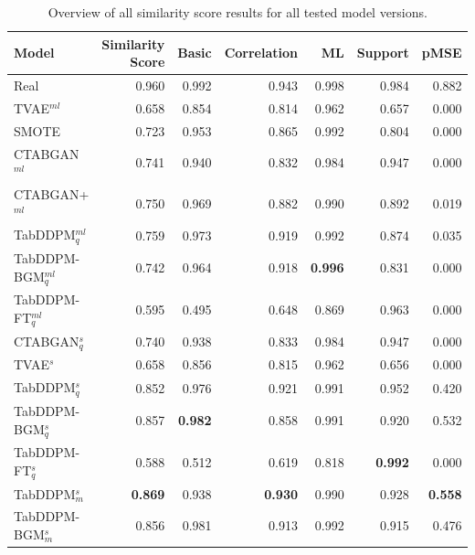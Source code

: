\begin{table}[h]
	\centering
	\begin{tabular}{lrrrrrr}
		\toprule
		\textbf{Model}       & \textbf{Similarity Score} & \textbf{Basic} & \textbf{Correlation} & \textbf{ML}    & \textbf{Support} & \textbf{pMSE}  \\
		\midrule
		Real                 & 0.960                     & 0.992          & 0.943                & 0.998          & 0.984            & 0.882          \\
		TVAE$^{ml}$          & 0.658                     & 0.854          & 0.814                & 0.962          & 0.657            & 0.000          \\
		SMOTE                & 0.723                     & 0.953          & 0.865                & 0.992          & 0.804            & 0.000          \\
		CTABGAN$^{ml}$       & 0.741                     & 0.940          & 0.832                & 0.984          & 0.947            & 0.000          \\
		CTABGAN+$^{ml}$      & 0.750                     & 0.969          & 0.882                & 0.990          & 0.892            & 0.019          \\
		TabDDPM$^{ml}_q$     & 0.759                     & 0.973          & 0.919                & 0.992          & 0.874            & 0.035          \\
		TabDDPM-BGM$^{ml}_q$ & 0.742                     & 0.964          & 0.918                & \textbf{0.996} & 0.831            & 0.000          \\
		TabDDPM-FT$^{ml}_q$  & 0.595                     & 0.495          & 0.648                & 0.869          & 0.963            & 0.000          \\
		CTABGAN$^{s}_q$      & 0.740                     & 0.938          & 0.833                & 0.984          & 0.947            & 0.000          \\
		TVAE$^{s}$           & 0.658                     & 0.856          & 0.815                & 0.962          & 0.656            & 0.000          \\
		TabDDPM$^{s}_q$      & 0.852                     & 0.976          & 0.921                & 0.991          & 0.952            & 0.420          \\
		TabDDPM-BGM$^{s}_q$  & 0.857                     & \textbf{0.982} & 0.858                & 0.991          & 0.920            & 0.532          \\
		TabDDPM-FT$^{s}_q$   & 0.588                     & 0.512          & 0.619                & 0.818          & \textbf{0.992}   & 0.000          \\
		TabDDPM$^{s}_m$      & \textbf{0.869}            & 0.938          & \textbf{0.930}       & 0.990          & 0.928            & \textbf{0.558} \\
		TabDDPM-BGM$^{s}_m$  & 0.856                     & 0.981          & 0.913                & 0.992          & 0.915            & 0.476          \\
		\bottomrule
	\end{tabular}
	\caption{Overview of all similarity score results for all tested model versions.}
	\label{tab:sim-all}
\end{table}
